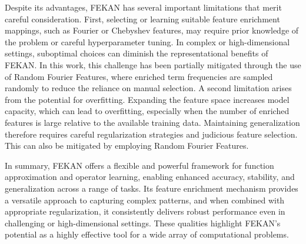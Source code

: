 \documentclass{article}
\begin{document}
Despite its advantages, FEKAN has several important limitations that merit careful consideration. First, selecting or learning suitable feature enrichment mappings, such as Fourier or Chebyshev features, may require prior knowledge of the problem or careful hyperparameter tuning. In complex or high-dimensional settings, suboptimal choices can diminish the representational benefits of FEKAN. In this work, this challenge has been partially mitigated through the use of Random Fourier Features, where enriched term frequencies are sampled randomly to reduce the reliance on manual selection. A second limitation arises from the potential for overfitting. Expanding the feature space increases model capacity, which can lead to overfitting, especially when the number of enriched features is large relative to the available training data. Maintaining generalization therefore requires careful regularization strategies and judicious feature selection. This can also be mitigated by employing Random Fourier Features.

In summary, FEKAN offers a flexible and powerful framework for function approximation and operator learning, enabling enhanced accuracy, stability, and generalization across a range of tasks. Its feature enrichment mechanism provides a versatile approach to capturing complex patterns, and when combined with appropriate regularization, it consistently delivers robust performance even in challenging or high-dimensional settings. These qualities highlight FEKAN's potential as a highly effective tool for a wide array of computational problems.
\end{document}
